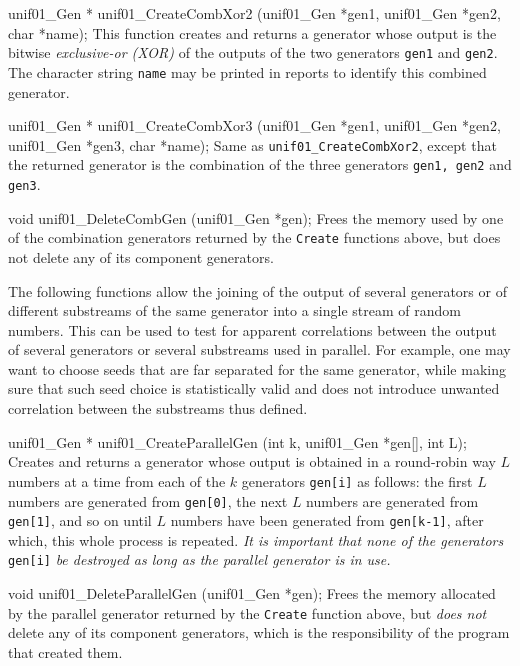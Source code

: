 unif01_Gen * unif01_CreateCombXor2 (unif01_Gen *gen1, unif01_Gen *gen2,
                                    char *name);
\endcode
 \tab  This function creates and returns a generator whose output is the
 bitwise {\sl exclusive-or (XOR)\/}  of the outputs of the two generators
 {\tt gen1} and {\tt gen2}. The character string {\tt name} may be printed
 in reports to identify this combined generator.
 \endtab
\code


unif01_Gen * unif01_CreateCombXor3 (unif01_Gen *gen1, unif01_Gen *gen2,
                                    unif01_Gen *gen3, char *name);
\endcode
 \tab  Same as {\tt unif01\_CreateCombXor2}, except that the 
 returned generator is the combination of the three generators
 {\tt gen1, gen2} and {\tt gen3}.
 \endtab
\code


void unif01_DeleteCombGen (unif01_Gen *gen);
\endcode
 \tab  Frees the memory used by one of the combination generators returned
  by the  {\tt Create} functions above, but does not delete any of its
  component generators.
 \endtab



 The following functions allow the joining of the output of several generators
 or of different substreams of the same generator into a single stream of
 random numbers. This can be used to test for apparent correlations between the
 output of several generators or several substreams used in parallel.
 For example, one may want to choose seeds 
 that are far separated for the same generator, while making sure that 
 such seed choice is statistically valid and does not introduce unwanted 
 correlation between the substreams thus defined.
\code

unif01_Gen * unif01_CreateParallelGen (int k, unif01_Gen *gen[], int L);
\endcode
 \tab Creates and returns a generator whose output is obtained in a round-robin
  way $L$ numbers at a time from each of the $k$ generators \texttt{gen[i]} as 
  follows: the first $L$ numbers are generated from \texttt{gen[0]}, the next 
  $L$ numbers are generated from \texttt{gen[1]}, and so on until 
  $L$ numbers have been generated from \texttt{gen[k-1]}, after which, this whole
  process is repeated. \emph{It is important that none of the generators} 
 \texttt{gen[i]} \emph{be destroyed as long as the parallel generator is in use.}
 \endtab
\code


void unif01_DeleteParallelGen (unif01_Gen *gen);
\endcode
 \tab  Frees the memory allocated by the parallel generator returned
  by the  {\tt Create} function above, but \emph{does not} delete any of its
  component generators, which is the responsibility of the program that
  created them.
 \endtab


